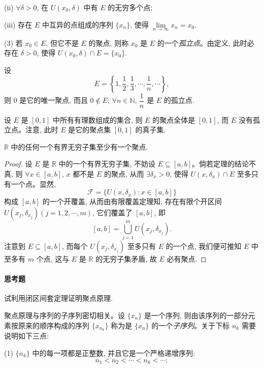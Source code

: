 (ii) $\forall\delta>0$, 在 $U(x_0,\delta)$ 中有 $E$ 的无穷多个点;

(iii) 存在 $E$ 中互异的点组成的序列 $\{x_n\}$, 使得 $\lim\limits_{n\to\infty}x_n=x_0$.

(3) 若 $x_0\in E$, 但它不是 $E$ 的聚点, 则称 $x_0$ 是 $E$ 的一个\emph{孤立点}。由定义, 此时必存在 $\delta>0$, 使得 $U(x_0,\delta)\cap E=\{x_0\}$.

\begin{example}\label{example:ma-2-4-4}
设
\[
  E=\left\{1,\frac12,\frac13,\cdots,\frac1n,\cdots\right\},
\]
则 $0$ 是它的唯一聚点, 而且 $0\notin E$; $\forall n\in\mathbb{N}$, $\dfrac1n$ 是 $E$ 的孤立点.
\end{example}


\begin{example}\label{example:ma-2-4-5}
设 $E$ 是 $[0,1]$ 中所有有理数组成的集合, 则 $E$ 的聚点全体是 $[0,1]$, 而 $E$ 没有孤立点。注意, 此时 $E$ 是它的聚点集 $[0,1]$ 的真子集.
\end{example}


\begin{theorem}[{聚点原理}]\label{theorem:ma-2-4-3}
$\mathbb{R}$ 中的任何一个有界无穷子集至少有一个聚点.
\end{theorem}


\begin{proof}
设 $E$ 是 $\mathbb{R}$ 中的一个有界无穷子集, 不妨设 $E\subseteq[a,b]$。倘若定理的结论不真, 则 $\forall x\in[a,b]$, $x$ 都不是 $E$ 的聚点, 从而 $\exists\delta_x>0$, 使得 $U(x,\delta_x)\cap E$ 至多只有一个点。显然,
\[
  \mathcal{F}=\{U(x,\delta_x):x\in[a,b]\}
\]
构成 $[a,b]$ 的一个开覆盖, 从而由有限覆盖定理知, 存在有限个开区间 $U(x_j,\delta_{x_j})(j=1,2,\cdots,m)$, 它们覆盖了 $[a,b]$, 即
\[
  [a,b]=\bigcup_{j=1}^m U(x_j,\delta_{x_j}).
\]
注意到 $E\subseteq[a,b]$, 而每个 $U(x_j,\delta_{x_j})$ 至多只有 $E$ 的一个点, 我们便可推知 $E$ 中至多有 $m$ 个点, 这与 $E$ 是 $\mathbb{R}$ 的无穷子集矛盾, 故 $E$ 必有聚点.
\end{proof}


\paragraph*{思考题}
试利用闭区间套定理证明聚点原理.

聚点原理与序列的子序列密切相关。设 $\{x_n\}$ 是一个序列, 则由该序列的一部分元素按原来的顺序构成的序列 $\{x_{n_k}\}$ 称为是 $\{x_n\}$ 的一个\emph{子序列}。关于下标 $n_k$ 需要说明如下三点:

(1) $\{n_k\}$ 中的每一项都是正整数, 并且它是一个严格递增序列:
\[
  n_1<n_2<\cdots<n_k<\cdots;
\]

